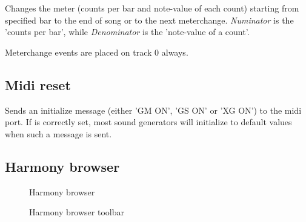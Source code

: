 \documentclass[letterpaper]{report}
\begin{document}
Changes the meter (counts per bar and note-value of each count) starting
from specified bar to the end of song or to the
next meterchange. {\em Numinator} is the 'counts per bar', while
{\em Denominator} is the 'note-value of a count'.

Meterchange events are placed on track 0 always.

\subsection{Midi reset}\label{panic}

Sends an initialize message (either 'GM ON', 'GS ON' or 'XG ON') to the midi
port. If  is correctly set, most sound
generators will initialize to default values when such a message is
sent.

\subsection{Harmony browser}\label{hbrowser}

\begin{figure}
\caption{Harmony browser}
\end{figure}

\begin{figure}
\caption{Harmony browser toolbar}
\end{figure}
\end{document}

